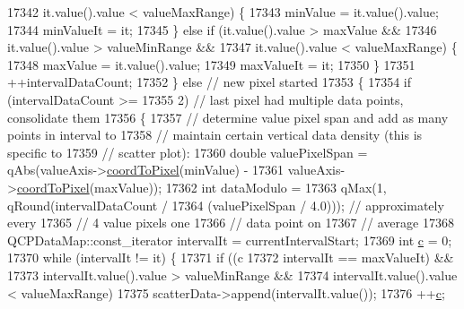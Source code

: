 \begin{DoxyCode}
17342               it.value().value < valueMaxRange) \{
17343             minValue = it.value().value;
17344             minValueIt = it;
17345           \} \textcolor{keywordflow}{else} \textcolor{keywordflow}{if} (it.value().value > maxValue &&
17346                      it.value().value > valueMinRange &&
17347                      it.value().value < valueMaxRange) \{
17348             maxValue = it.value().value;
17349             maxValueIt = it;
17350           \}
17351           ++intervalDataCount;
17352         \} \textcolor{keywordflow}{else} \textcolor{comment}{// new pixel started}
17353         \{
17354           \textcolor{keywordflow}{if} (intervalDataCount >=
17355               2) \textcolor{comment}{// last pixel had multiple data points, consolidate them}
17356           \{
17357             \textcolor{comment}{// determine value pixel span and add as many points in interval to}
17358             \textcolor{comment}{// maintain certain vertical data density (this is specific to}
17359             \textcolor{comment}{// scatter plot):}
17360             \textcolor{keywordtype}{double} valuePixelSpan = qAbs(valueAxis->\hyperlink{class_q_c_p_axis_a985ae693b842fb0422b4390fe36d299a}{coordToPixel}(minValue) -
17361                                          valueAxis->\hyperlink{class_q_c_p_axis_a985ae693b842fb0422b4390fe36d299a}{coordToPixel}(maxValue));
17362             \textcolor{keywordtype}{int} dataModulo =
17363                 qMax(1, qRound(intervalDataCount /
17364                                (valuePixelSpan / 4.0))); \textcolor{comment}{// approximately every}
17365                                                          \textcolor{comment}{// 4 value pixels one}
17366                                                          \textcolor{comment}{// data point on}
17367                                                          \textcolor{comment}{// average}
17368             QCPDataMap::const\_iterator intervalIt = currentIntervalStart;
17369             \textcolor{keywordtype}{int} \hyperlink{_comparision_pictures_2_createtest_image_8m_ae0323a9039add2978bf5b49550572c7c}{c} = 0;
17370             \textcolor{keywordflow}{while} (intervalIt != it) \{
17371               \textcolor{keywordflow}{if} ((c %
17372                    intervalIt == maxValueIt) &&
17373                   intervalIt.value().value > valueMinRange &&
17374                   intervalIt.value().value < valueMaxRange)
17375                 scatterData->append(intervalIt.value());
17376               ++\hyperlink{_comparision_pictures_2_createtest_image_8m_ae0323a9039add2978bf5b49550572c7c}{c};

\end{DoxyCode}
